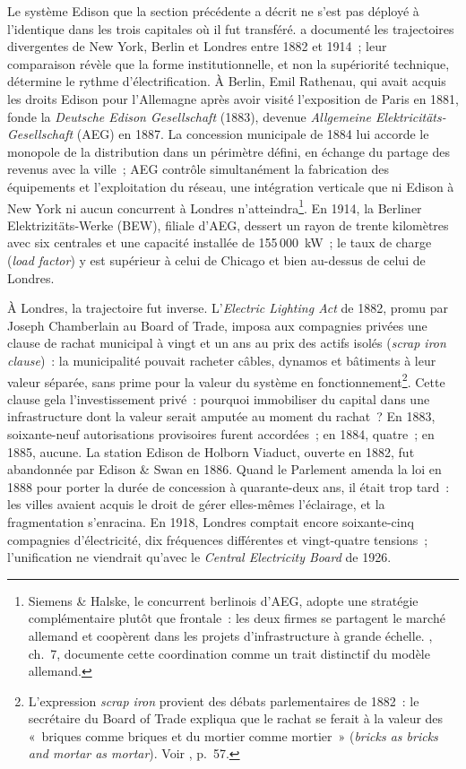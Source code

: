 %
Le système Edison que la section précédente a décrit ne s'est pas déployé à l'identique dans les trois capitales où il fut transféré. \textcite{hughes_networks_1983} a documenté les trajectoires divergentes de New York, Berlin et Londres entre 1882 et 1914~; leur comparaison révèle que la forme institutionnelle, et non la supériorité technique, détermine le rythme d'électrification. À Berlin, Emil Rathenau, qui avait acquis les droits Edison pour l'Allemagne après avoir visité l'exposition de Paris en 1881, fonde la \emph{Deutsche Edison Gesellschaft} (1883), devenue \emph{Allgemeine Elektricitäts-Gesellschaft} (AEG) en 1887. La concession municipale de 1884 lui accorde le monopole de la distribution dans un périmètre défini, en échange du partage des revenus avec la ville~; AEG contrôle simultanément la fabrication des équipements et l'exploitation du réseau, une intégration verticale que ni Edison à New York ni aucun concurrent à Londres n'atteindra\footnote{Siemens \& Halske, le concurrent berlinois d'AEG, adopte une stratégie complémentaire plutôt que frontale~: les deux firmes se partagent le marché allemand et coopèrent dans les projets d'infrastructure à grande échelle. \textcite{hughes_networks_1983}, ch.~7, documente cette coordination comme un trait distinctif du modèle allemand.}. En 1914, la Berliner Elektrizitäts-Werke (BEW), filiale d'AEG, dessert un rayon de trente kilomètres avec six centrales et une capacité installée de 155\,000~kW~; le taux de charge (\emph{load factor}) y est supérieur à celui de Chicago et bien au-dessus de celui de Londres.

%
À Londres, la trajectoire fut inverse. L'\emph{Electric Lighting Act} de 1882, promu par Joseph Chamberlain au Board of Trade, imposa aux compagnies privées une clause de rachat municipal à vingt et un ans au prix des actifs isolés (\emph{scrap iron clause})~: la municipalité pouvait racheter câbles, dynamos et bâtiments à leur valeur séparée, sans prime pour la valeur du système en fonctionnement\footnote{L'expression \emph{scrap iron} provient des débats parlementaires de 1882~: le secrétaire du Board of Trade expliqua que le rachat se ferait à la valeur des «~briques comme briques et du mortier comme mortier~» (\emph{bricks as bricks and mortar as mortar}). Voir \textcite{hughes_networks_1983}, p.~57.}. Cette clause gela l'investissement privé~: pourquoi immobiliser du capital dans une infrastructure dont la valeur serait amputée au moment du rachat~? En 1883, soixante-neuf autorisations provisoires furent accordées~; en 1884, quatre~; en 1885, aucune. La station Edison de Holborn Viaduct, ouverte en 1882, fut abandonnée par Edison \& Swan en 1886. Quand le Parlement amenda la loi en 1888 pour porter la durée de concession à quarante-deux ans, il était trop tard~: les villes avaient acquis le droit de gérer elles-mêmes l'éclairage, et la fragmentation s'enracina. En 1918, Londres comptait encore soixante-cinq compagnies d'électricité, dix fréquences différentes et vingt-quatre tensions~; l'unification ne viendrait qu'avec le \emph{Central Electricity Board} de 1926.

